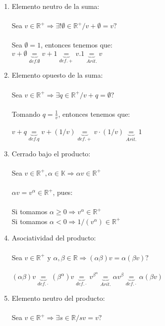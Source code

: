 \documentclass{article}
\begin{document}
\begin{enumerate}[1.]
\begin{enumerate}[(1)]
\item
	Elemento neutro de la suma: \\ \\
	Sea $v \in \mathbb{R}^+ \Rightarrow \exists! \emptyset \in \mathbb{R}^+ / v+\emptyset = v?$ \\ \\
	Sea $\emptyset = 1$, entonces tenemos que: \\ 
	$v + \emptyset \underbrace{=}_{def.\emptyset} v + 1 \underbrace{=}_{def.+} v.1 \underbrace{=}_{Arit.} v$
\item
	Elemento opuesto de la suma: \\ \\
	Sea $v \in \mathbb{R}^+ \Rightarrow \exists q \in \mathbb{R}^+ / v + q = \emptyset?$ \\ \\
	Tomando $q = \displaystyle \frac{1}{v}$, entonces tenemos que: \\ \\
	$v + q \underbrace{=}_{def.q} v + (1/v)  \underbrace{=}_{def.+} v \cdot (1/v) \underbrace{=}_{Arit.} 1$
\item
	Cerrado bajo el producto: \\ \\
	Sea $v \in \mathbb{R}^+, \alpha \in \mathbb{K} \Rightarrow \alpha v \in \mathbb{R}^+$ \\ \\
	$\alpha v = v^{\alpha} \in \mathbb{R}^+$, pues: \\ \\
	Si tomamos $\alpha \geq 0 \Rightarrow v^{\alpha} \in \mathbb{R}^+$ \\
	Si tomamos $\alpha < 0 \Rightarrow 1/(v^\alpha) \in \mathbb{R}^+$ 
\item
	Asociatividad del producto: \\ \\
	Sea $v \in \mathbb{R}^+$ y $\alpha,\beta \in \mathbb{R} \Rightarrow (\alpha \beta)v = \alpha(\beta v)?$ \\ \\
	$(\alpha \beta)v \underbrace{=}_{def. \cdot} (\beta^{\alpha})v \underbrace{=}_{def. \cdot} v^{\beta^\alpha} 
	\underbrace{=}_{Arit.} \alpha v^\beta \underbrace{=}_{def. \cdot} \alpha (\beta v) $\\
\item
	Elemento neutro del producto: \\ \\
	Sea $v \in \mathbb{R}^+ \Rightarrow \exists s \in \mathbb{R} / sv = v ?$ \\ \\

\end{enumerate}
\end{enumerate}
\end{document}
